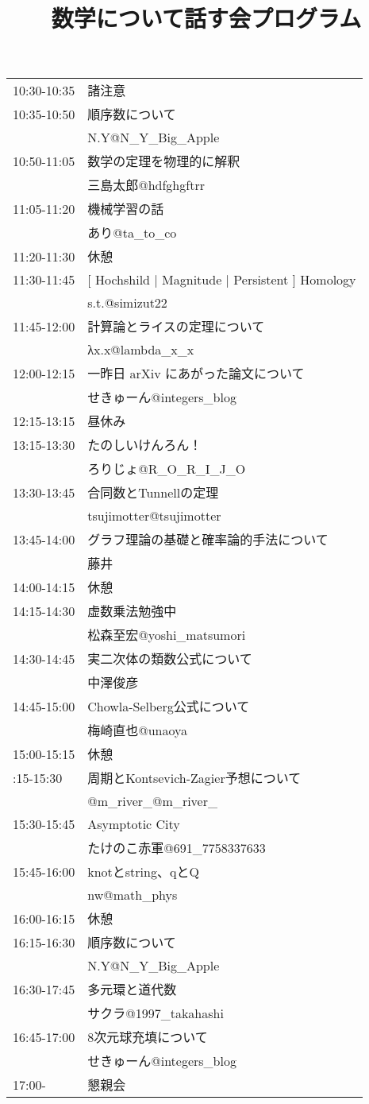 \documentclass[uplatex]{jsarticle}
\title{数学について話す会プログラム}
\begin{document}
\date{}
\maketitle
\begin{longtable}{ll}
10:30-10:35 & 諸注意\\
10:35-10:50 & 順序数について\\
& N.Y@N\_Y\_Big\_Apple\\
10:50-11:05 & 数学の定理を物理的に解釈\\
& 三島太郎@hdfghgftrr\\
11:05-11:20 & 機械学習の話\\
& あり@ta\_to\_co\\
11:20-11:30 & 休憩\\
11:30-11:45 & [ Hochshild | Magnitude | Persistent ] Homology\\
& s.t.@simizut22\\
11:45-12:00 & 計算論とライスの定理について\\
& λx.x@lambda\_x\_x\\
12:00-12:15 & 一昨日 arXiv にあがった論文について\\
& せきゅーん@integers\_blog\\
12:15-13:15 & 昼休み\\
13:15-13:30 & たのしいけんろん！\\
& ろりじょ@R\_O\_R\_I\_J\_O\\
13:30-13:45 & 合同数とTunnellの定理\\
& tsujimotter@tsujimotter\\
13:45-14:00 & グラフ理論の基礎と確率論的手法について\\
& 藤井\\
14:00-14:15 & 休憩\\
14:15-14:30 & 虚数乗法勉強中\\
& 松森至宏@yoshi\_matsumori\\
14:30-14:45 & 実二次体の類数公式について\\
& 中澤俊彦\\
14:45-15:00 & Chowla-Selberg公式について\\
& 梅崎直也@unaoya\\
15:00-15:15 & 休憩\\
\newpage
15:15-15:30 & 周期とKontsevich-Zagier予想について\\
& @m\_river\_@m\_river\_\\
15:30-15:45 & Asymptotic City\\
& たけのこ赤軍@691\_7758337633\\
15:45-16:00 & knotとstring、qとQ\\
& nw@math\_phys\\
16:00-16:15 & 休憩\\
16:15-16:30 & 順序数について\\
& N.Y@N\_Y\_Big\_Apple\\
16:30-17:45 & 多元環と道代数\\
& サクラ@1997\_takahashi\\
16:45-17:00 & 8次元球充填について\\
& せきゅーん@integers\_blog\\
17:00- & 懇親会
\end{longtable}
\end{document}
